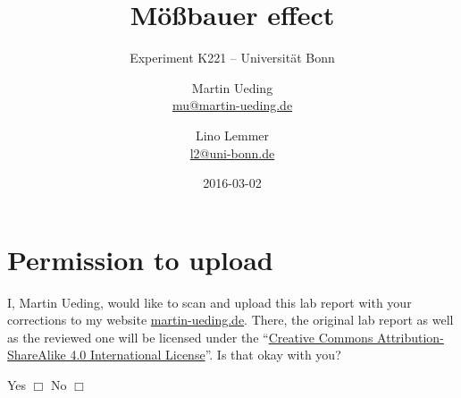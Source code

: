 \documentclass[11pt, english, fleqn, DIV=15, headinclude, BCOR=2cm]{scrreprt}
\title{Mößbauer effect}
\subtitle{Experiment K221 -- Universität Bonn}
\author{
    Martin Ueding \\
    \small{\href{mailto:mu@martin-ueding.de}{mu@martin-ueding.de}}
    \and
    Lino Lemmer \\
    \small{\href{mailto:l2@uni-bonn.de}{l2@uni-bonn.de}}
}
\date{2016-03-02}
\begin{document}
\maketitle

\chapter*{Permission to upload}

I, Martin Ueding, would like to scan and upload this lab report with your
corrections to my website \href{http://martin-ueding.de}{martin-ueding.de}.
There, the original lab report as well as the reviewed one will be licensed
under the “\href{http://creativecommons.org/licenses/by-sa/4.0/}{Creative
Commons Attribution-ShareAlike 4.0 International License}”. Is that okay with
you?

Yes $\Box$ \hspace{2cm} No $\Box$

\begin{abstract}
\end{abstract}

\tableofcontents
\end{document}
